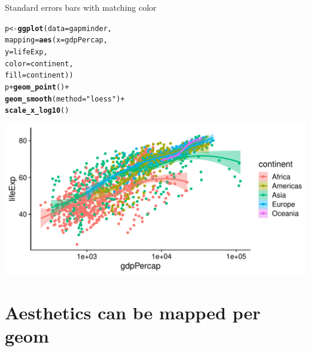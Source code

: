 \documentclass[10pt]{beamer}\usepackage[]{graphicx}\usepackage[]{color}
\makeatletter
\def\maxwidth{ %
  \ifdim\Gin@nat@width>\linewidth
    \linewidth
  \else
    \Gin@nat@width
  \fi
}
\newcommand{\hlstr}[1]{\textcolor[rgb]{0.192,0.494,0.8}{#1}}%
\newcommand{\hlopt}[1]{\textcolor[rgb]{0,0,0}{#1}}%
\newcommand{\hlstd}[1]{\textcolor[rgb]{0.345,0.345,0.345}{#1}}%
\newcommand{\hlkwb}[1]{\textcolor[rgb]{0.69,0.353,0.396}{#1}}%
\newcommand{\hlkwc}[1]{\textcolor[rgb]{0.333,0.667,0.333}{#1}}%
\newcommand{\hlkwd}[1]{\textcolor[rgb]{0.737,0.353,0.396}{\textbf{#1}}}%
\newenvironment{kframe}{%
 \def\at@end@of@kframe{}%
 \ifinner\ifhmode%
  \def\at@end@of@kframe{\end{minipage}}%
  \begin{minipage}{\columnwidth}%
 \fi\fi%
 \def\FrameCommand##1{\hskip\@totalleftmargin \hskip-\fboxsep
 \colorbox{shadecolor}{##1}\hskip-\fboxsep
     \hskip-\linewidth \hskip-\@totalleftmargin \hskip\columnwidth}%
 \MakeFramed {\advance\hsize-\width
   \@totalleftmargin\z@ \linewidth\hsize
   \@setminipage}}%
 {\par\unskip\endMakeFramed%
 \at@end@of@kframe}
\newenvironment{knitrout}{}{} %
\makeatother
\begin{document}
\begin{frame}[fragile]{Standard errors bars with matching color}
\begin{knitrout}\tiny
{}\color{fgcolor}\begin{kframe}
\begin{alltt}
\hlstd{p} \hlkwb{<-} \hlkwd{ggplot}\hlstd{(}\hlkwc{data} \hlstd{= gapminder,}
                \hlkwc{mapping} \hlstd{=} \hlkwd{aes}\hlstd{(}\hlkwc{x} \hlstd{= gdpPercap,}
                \hlkwc{y} \hlstd{= lifeExp,}
                \hlkwc{color} \hlstd{= continent,}
                \hlkwc{fill} \hlstd{= continent))}
\hlstd{p} \hlopt{+} \hlkwd{geom_point}\hlstd{()} \hlopt{+}
\hlkwd{geom_smooth}\hlstd{(}\hlkwc{method} \hlstd{=} \hlstr{"loess"}\hlstd{)} \hlopt{+}
\hlkwd{scale_x_log10}\hlstd{()}
\end{alltt}
\end{kframe}

{\centering \includegraphics[width=\maxwidth]{figure/unnamed-chunk-17-1} 

}


\end{knitrout}
\end{frame}






\section{Aesthetics can be mapped per geom}
\end{document}
